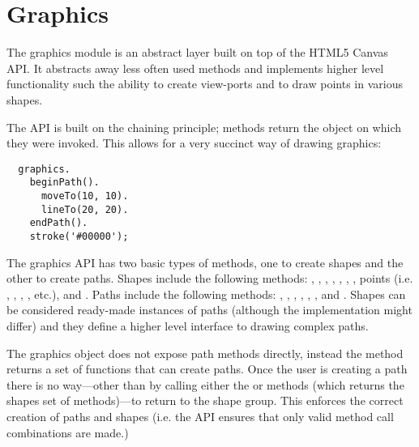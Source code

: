 \section{Graphics}
The graphics module is an abstract layer built on top of the HTML5 Canvas API. It abstracts away less often used methods and implements higher level functionality such the ability to create view-ports and to draw points in various shapes.

The API is built on the chaining principle; methods return the object on which they were invoked. This allows for a very succinct way of drawing graphics:
\begin{verbatim}
  graphics.
    beginPath().
      moveTo(10, 10).
      lineTo(20, 20).
    endPath().
    stroke('#00000');
\end{verbatim}
The graphics API has two basic types of methods, one to create shapes and the other to create paths. Shapes include the following methods: , , , , , , , points (i.e. , , , , etc.), and . Paths include the following methods: , , , , , , and . Shapes can be considered ready-made instances of paths (although the implementation might differ) and they define a higher level interface to drawing complex paths.

The graphics object does not expose path methods directly, instead the  method returns a set of functions that can create paths. Once the user is creating a path there is no way---other than by calling either the  or  methods (which returns the shapes set of methods)---to return to the shape group. This enforces the correct creation of paths and shapes (i.e. the API ensures that only valid method call combinations are made.)

